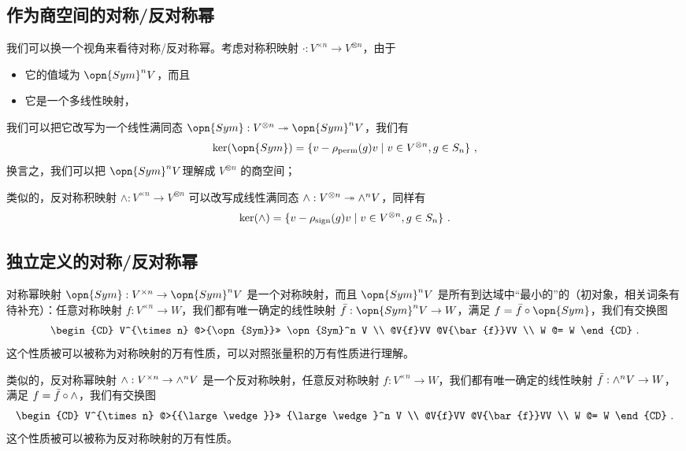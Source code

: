 \subsection{作为商空间的对称/反对称幂}

我们可以换一个视角来看待对称/反对称幂。考虑对称积映射 $\cdot: V^{\times n} \to V^{\otimes n}$，由于
\begin{itemize}
\item 它的值域为 $\opn{Sym}^n V$，而且
\item 它是一个多线性映射，
\end{itemize}
我们可以把它改写为一个线性满同态 $\opn{Sym}: V^{\otimes n} \twoheadrightarrow \opn{Sym}^n V$，我们有
\begin{equation}
\ker(\opn{Sym}) = \{v - \rho_\text{perm}(g) v \mid v \in V^{\otimes n}, g \in S_n\}~,
\end{equation}
换言之，我们可以把 $\opn{Sym}^n V$理解成 $V^{\otimes n}$ 的商空间；

类似的，反对称积映射 $\wedge: V^{\times n} \to V^{\otimes n}$ 可以改写成线性满同态 ${\large \wedge}: V^{\otimes n} \twoheadrightarrow {\large \wedge}^n V$，同样有
\begin{equation}
\ker({\large \wedge}) = \{v - \rho_\text{sign}(g) v \mid v \in V^{\otimes n}, g \in S_n\}~.
\end{equation}

\subsection{独立定义的对称/反对称幂}


对称幂映射 $\opn{Sym}: V^{\times n} \to \opn{Sym}^n V$ 是一个对称映射，而且 $\opn{Sym}^n V$ 是所有到达域中“最小的”的（初对象，相关词条有待补充）：任意对称映射 $f: V^{\times n} \to W$，我们都有唯一确定的线性映射 $\bar{f}: \opn{Sym}^n V \to W$，满足 $f = \bar{f} \circ \opn{Sym}$，我们有交换图
\begin{equation}
\begin{CD}
V^{\times n} @>{\opn{Sym}}>> \opn{Sym}^n V \\
@V{f}VV @V{\bar{f}}VV \\
W @= W
\end{CD}~.
\end{equation}
这个性质被可以被称为对称映射的万有性质，可以对照张量积的万有性质进行理解。


类似的，反对称幂映射 ${\large \wedge}: V^{\times n} \to {\large \wedge}^n V$ 是一个反对称映射，任意反对称映射 $f: V^{\times n} \to W$，我们都有唯一确定的线性映射 $\bar{f}: {\large \wedge}^n V \to W$，满足 $f = \bar{f} \circ {\large \wedge}$，我们有交换图
\begin{equation}
\begin{CD}
V^{\times n} @>{{\large \wedge}}>> {\large \wedge}^n V \\
@V{f}VV @V{\bar{f}}VV \\
W @= W
\end{CD}~.
\end{equation}
这个性质被可以被称为反对称映射的万有性质。